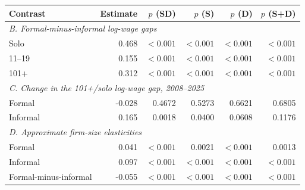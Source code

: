 \begin{tabular}{@{}p{}rrrrr@{}}
\toprule
    Contrast & Estimate & $p$ (SD) & $p$ (S) & $p$ (D) & $p$ (S+D) \\
    \midrule

    \multicolumn{6}{l}{\textit{B. Formal-minus-informal log-wage gaps}} \\
Solo & 0.468 & $<0.001$ & $<0.001$ & $<0.001$ & $<0.001$ \\
11--19 & 0.155 & $<0.001$ & $<0.001$ & $<0.001$ & $<0.001$ \\
101+ & 0.312 & $<0.001$ & $<0.001$ & $<0.001$ & $<0.001$ \\
\midrule
    \multicolumn{6}{l}{\textit{C. Change in the 101+/solo log-wage gap, 2008--2025}} \\
Formal & -0.028 & 0.4672 & 0.5273 & 0.6621 & 0.6805 \\
Informal & 0.165 & 0.0018 & 0.0400 & 0.0608 & 0.1176 \\
\midrule
    \multicolumn{6}{l}{\textit{D. Approximate firm-size elasticities}} \\
Formal & 0.041 & $<0.001$ & 0.0021 & $<0.001$ & 0.0013 \\
Informal & 0.097 & $<0.001$ & $<0.001$ & $<0.001$ & $<0.001$ \\
Formal-minus-informal & -0.055 & $<0.001$ & $<0.001$ & $<0.001$ & $<0.001$\\
\bottomrule\end{tabular}
